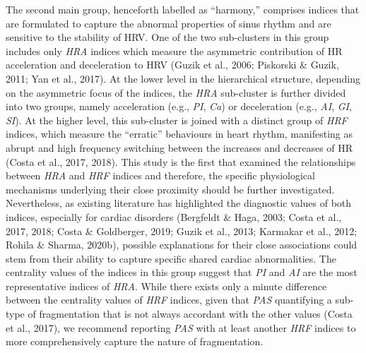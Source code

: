 \documentclass[
  english,
  jou,floatsintext]{apa6}
\begin{document}
The second main group, henceforth labelled as ``harmony,'' comprises indices that are formulated to capture the abnormal properties of sinus rhythm and are sensitive to the stability of HRV. One of the two sub-clusters in this group includes only \emph{HRA} indices which measure the asymmetric contribution of HR acceleration and deceleration to HRV (Guzik et al., 2006; Piskorski \& Guzik, 2011; Yan et al., 2017). At the lower level in the hierarchical structure, depending on the asymmetric focus of the indices, the \emph{HRA} sub-cluster is further divided into two groups, namely acceleration (e.g., \emph{PI}, \emph{Ca}) or deceleration (e.g., \emph{AI}, \emph{GI}, \emph{SI}). At the higher level, this sub-cluster is joined with a distinct group of \emph{HRF} indices, which measure the ``erratic'' behaviours in heart rhythm, manifesting as abrupt and high frequency switching between the increases and decreases of HR (Costa et al., 2017, 2018). This study is the first that examined the relationships between \emph{HRA} and \emph{HRF} indices and therefore, the specific physiological mechanisms underlying their close proximity should be further investigated. Nevertheless, as existing literature has highlighted the diagnostic values of both indices, especially for cardiac disorders (Bergfeldt \& Haga, 2003; Costa et al., 2017, 2018; Costa \& Goldberger, 2019; Guzik et al., 2013; Karmakar et al., 2012; Rohila \& Sharma, 2020b), possible explanations for their close associations could stem from their ability to capture specific shared cardiac abnormalities. The centrality values of the indices in this group suggest that \emph{PI} and \emph{AI} are the most representative indices of \emph{HRA}. While there exists only a minute difference between the centrality values of \emph{HRF} indices, given that \emph{PAS} quantifying a sub-type of fragmentation that is not always accordant with the other values (Costa et al., 2017), we recommend reporting \emph{PAS} with at least another \emph{HRF} indices to more comprehensively capture the nature of fragmentation.
\end{document}
